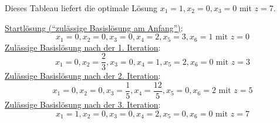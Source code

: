 \documentclass[10pt,a4paper,oneside,ngerman,numbers=noenddot]{scrartcl}
\begin{document}
	Dieses Tableau liefert die optimale Lösung $x_{1} = 1, x_{2} = 0, x_{3} = 0$ mit $z = 7$.
		
	\underline{Startlösung ("`zulässige Basislösung am Anfang"')}:
	\[
		x_{1} = 0, x_{2} = 0, x_{3} = 0, x_{4} = 2, x_{5} = 3, x_{6} = 1 \text{ mit } z = 0
	\]
	\underline{Zulässige Basislösung nach der 1. Iteration}:
	\[
		x_{1} = 0, x_{2} = \frac{2}{3}, x_{3} = 0, x_{4} = 1, x_{5} = 2, x_{6} = 0 \text{ mit } z = 3
	\]
	\underline{Zulässige Basislösung nach der 2. Iteration}:
	\[
		x_{1} = 0, x_{2} = 0, x_{3} = \frac{1}{5}, x_{4} = \frac{12}{5}, x_{5} = 0, x_{6} = 2 \text{ mit } z = 5
	\]
	\underline{Zulässige Basislösung nach der 3. Iteration}:
	\[
		x_{1} = 1, x_{2} = 0, x_{3} = 0, x_{4} = 2, x_{5} = 0, x_{6} = 0 \text{ mit } z = 7
	\]
\end{document}
